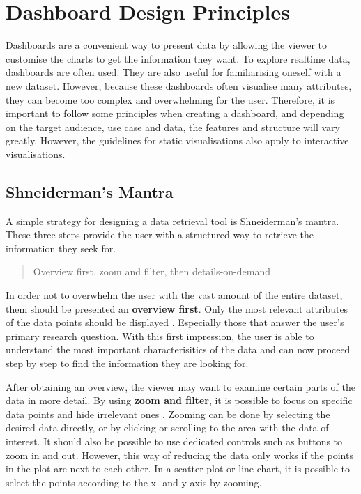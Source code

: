 \documentclass[11pt]{article}
\begin{document}
\pagebreak
\section{Dashboard Design Principles}

Dashboards are a convenient way to present data by allowing the viewer to customise the charts to get the information they want. To explore realtime data, dashboards are often used. They are also useful for familiarising oneself with a new dataset. However, because these dashboards often visualise many attributes, they can become too complex and overwhelming for the user. Therefore, it is important to follow some principles when creating a dashboard, and depending on the target audience, use case and data, the features and structure will vary greatly. However, the guidelines for static visualisations also apply to interactive visualisations.

\subsection{Shneiderman's Mantra}

A simple strategy for designing a data retrieval tool is Shneiderman's mantra. These three steps provide the user with a structured way to retrieve the information they seek for.

\begin{quote}
    Overview first, zoom and filter, then details-on-demand \parencite{shneiderman_thousand-fold_1997}
\end{quote}

In order not to overwhelm the user with the vast amount of the entire dataset, them should be presented an \textbf{overview first}. Only the most relevant attributes of the data points should be displayed \parencite{shneiderman_eyes_1996}. Especially those that answer the user's primary research question. With this first impression, the user is able to understand the most important characterisitics of the data and can now proceed step by step to find the information they are looking for.

After obtaining an overview, the viewer may want to examine certain parts of the data in more detail. By using \textbf{zoom and filter}, it is possible to focus on specific data points and hide irrelevant ones \parencite{shneiderman_eyes_1996}. Zooming can be done by selecting the desired data directly, or by clicking or scrolling to the area with the data of interest. It should also be possible to use dedicated controls such as buttons to zoom in and out. However, this way of reducing the data only works if the points in the plot are next to each other. In a scatter plot or line chart, it is possible to select the points according to the x- and y-axis by zooming.
\end{document}
